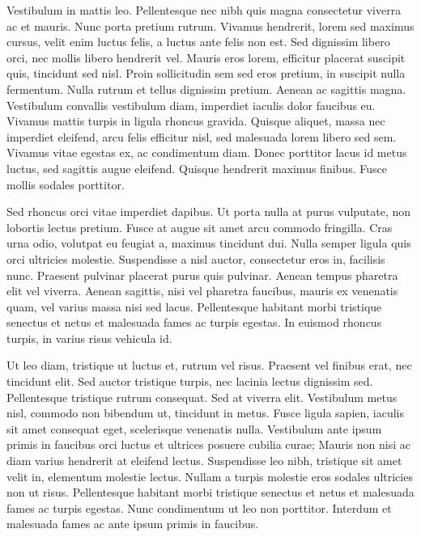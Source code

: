 Vestibulum in mattis leo. Pellentesque nec nibh quis magna consectetur viverra ac et mauris. Nunc porta pretium rutrum. Vivamus hendrerit, lorem sed maximus cursus, velit enim luctus felis, a luctus ante felis non est. Sed dignissim libero orci, nec mollis libero hendrerit vel. Mauris eros lorem, efficitur placerat suscipit quis, tincidunt sed nisl. Proin sollicitudin sem sed eros pretium, in suscipit nulla fermentum. Nulla rutrum et tellus dignissim pretium. Aenean ac sagittis magna. Vestibulum convallis vestibulum diam, imperdiet iaculis dolor faucibus eu. Vivamus mattis turpis in ligula rhoncus gravida. Quisque aliquet, massa nec imperdiet eleifend, arcu felis efficitur nisl, sed malesuada lorem libero sed sem. Vivamus vitae egestas ex, ac condimentum diam. Donec porttitor lacus id metus luctus, sed sagittis augue eleifend. Quisque hendrerit maximus finibus. Fusce mollis sodales porttitor.

Sed rhoncus orci vitae imperdiet dapibus. Ut porta nulla at purus vulputate, non lobortis lectus pretium. Fusce at augue sit amet arcu commodo fringilla. Cras urna odio, volutpat eu feugiat a, maximus tincidunt dui. Nulla semper ligula quis orci ultricies molestie. Suspendisse a nisl auctor, consectetur eros in, facilisis nunc. Praesent pulvinar placerat purus quis pulvinar. Aenean tempus pharetra elit vel viverra. Aenean sagittis, nisi vel pharetra faucibus, mauris ex venenatis quam, vel varius massa nisi sed lacus. Pellentesque habitant morbi tristique senectus et netus et malesuada fames ac turpis egestas. In euismod rhoncus turpis, in varius risus vehicula id.

Ut leo diam, tristique ut luctus et, rutrum vel risus. Praesent vel finibus erat, nec tincidunt elit. Sed auctor tristique turpis, nec lacinia lectus dignissim sed. Pellentesque tristique rutrum consequat. Sed at viverra elit. Vestibulum metus nisl, commodo non bibendum ut, tincidunt in metus. Fusce ligula sapien, iaculis sit amet consequat eget, scelerisque venenatis nulla. Vestibulum ante ipsum primis in faucibus orci luctus et ultrices posuere cubilia curae; Mauris non nisi ac diam varius hendrerit at eleifend lectus. Suspendisse leo nibh, tristique sit amet velit in, elementum molestie lectus. Nullam a turpis molestie eros sodales ultricies non ut risus. Pellentesque habitant morbi tristique senectus et netus et malesuada fames ac turpis egestas. Nunc condimentum ut leo non porttitor. Interdum et malesuada fames ac ante ipsum primis in faucibus.



